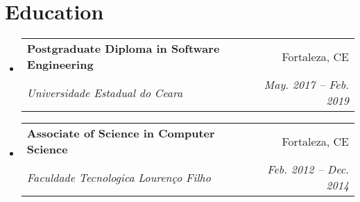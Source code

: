 \documentclass[letterpaper,11pt]{article}
\makeatletter
\newcommand{\resumeItem}[2]{
  \item\small{
    \textbf{#1}{: #2 \vspace{-2pt}}
  }
}
\newcommand{\resumeSubheading}[4]{
  \vspace{-1pt}\item
    \begin{tabular*}{0.97\textwidth}[t]{l@{\extracolsep{\fill}}r}
      \textbf{#1} & #2 \\
      \textit{\small#3} & \textit{\small #4} \\
    \end{tabular*}\vspace{-5pt}
}
\newcommand{\resumeSubSubheading}[2]{
    \begin{tabular*}{0.97\textwidth}{l@{\extracolsep{\fill}}r}
      \textit{\small#1} & \textit{\small #2} \\
    \end{tabular*}\vspace{-5pt}
}
\newcommand{\resumeSubItem}[2]{\resumeItem{#1}{#2}\vspace{-4pt}}
\newcommand{\resumeSubHeadingListStart}{\begin{itemize}[leftmargin=*]}
\newcommand{\resumeSubHeadingListEnd}{\end{itemize}}
\newcommand{\resumeItemListStart}{\begin{itemize}}
\newcommand{\resumeItemListEnd}{\end{itemize}\vspace{-5pt}}
\makeatother
\begin{document}
\section{Education}
\resumeSubHeadingListStart
\resumeSubheading
{Postgraduate Diploma in Software Engineering}{Fortaleza, CE}
{Universidade Estadual do Ceara}{May. 2017 -- Feb. 2019}
\resumeSubheading
{Associate of Science in Computer Science}{Fortaleza, CE}
{Faculdade Tecnologica Lourenço Filho}{Feb. 2012 -- Dec. 2014}
\resumeSubHeadingListEnd


%
%
\end{document}
